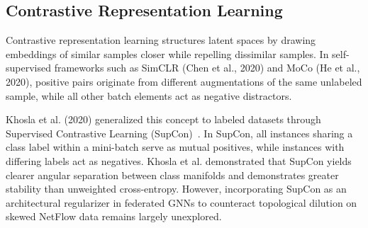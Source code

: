 \documentclass[12pt,a4paper]{report}
\begin{document}
\subsection{Contrastive Representation Learning}
Contrastive representation learning structures latent spaces by drawing embeddings of similar samples closer while repelling dissimilar samples. In self-supervised frameworks such as SimCLR (Chen et al., 2020) and MoCo (He et al., 2020), positive pairs originate from different augmentations of the same unlabeled sample, while all other batch elements act as negative distractors.

Khosla et al. (2020) generalized this concept to labeled datasets through Supervised Contrastive Learning (SupCon)~\cite{khosla2020supcon}. In SupCon, all instances sharing a class label within a mini-batch serve as mutual positives, while instances with differing labels act as negatives. Khosla et al. demonstrated that SupCon yields clearer angular separation between class manifolds and demonstrates greater stability than unweighted cross-entropy. However, incorporating SupCon as an architectural regularizer in federated GNNs to counteract topological dilution on skewed NetFlow data remains largely unexplored.
\end{document}
